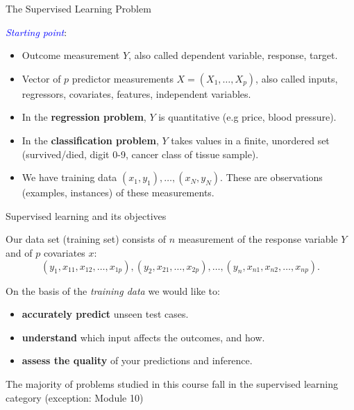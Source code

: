 \documentclass[ignorenonframetext,]{beamer}
\begin{document}
\begin{frame}{The Supervised Learning Problem}
\protect\hypertarget{the-supervised-learning-problem}{}

\textcolor{blue}{\emph{Starting point}}:

\begin{itemize}
\item
  Outcome measurement \(Y\), also called dependent variable, response,
  target.
\item
  Vector of \(p\) predictor measurements \(X=(X_1,\ldots,X_p)\), also
  called inputs, regressors, covariates, features, independent
  variables.
\item
  In the \textbf{regression problem}, \(Y\) is quantitative (e.g price,
  blood pressure).
\item
  In the \textbf{classification problem}, \(Y\) takes values in a
  finite, unordered set (survived/died, digit 0-9, cancer class of
  tissue sample).
\item
  We have training data \((x_1, y_1), \ldots , (x_N , y_N )\). These are
  observations (examples, instances) of these measurements.
\end{itemize}

\end{frame}

\begin{frame}

\begin{block}{Supervised learning and its objectives}

\vspace{2mm}

Our data set (training set) consists of \(n\) measurement of the
response variable \(Y\) and of \(p\) covariates \(x\):
\[(y_1, x_{11}, x_{12},\ldots, x_{1p}), (y_2, x_{21},\ldots, x_{2p}), \ldots, (y_n, x_{n1}, x_{n2},\ldots, x_{np}).\]
\(~\)

On the basis of the \emph{training data} we would like to:

\begin{itemize}
\item
  \textbf{accurately predict} unseen test cases.
\item
  \textbf{understand} which input affects the outcomes, and how.
\item
  \textbf{assess the quality} of your predictions and inference.
\end{itemize}

\vspace{2mm}

The majority of problems studied in this course fall in the supervised
learning category (exception: Module 10)

\end{block}

\end{frame}
\end{document}
